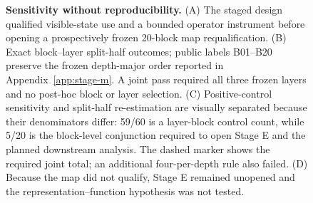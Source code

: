 \begin{figure}[H]
\caption{\label{fig:main}\textbf{Sensitivity without reproducibility.} (A) The staged design qualified visible-state use and a bounded operator instrument before opening a prospectively frozen 20-block map requalification. (B) Exact block--layer split-half outcomes; public labels B01--B20 preserve the frozen depth-major order reported in Appendix~\ref{app:stage-m}. A joint pass required all three frozen layers and no post-hoc block or layer selection. (C) Positive-control sensitivity and split-half re-estimation are visually separated because their denominators differ: 59/60 is a layer-block control count, while 5/20 is the block-level conjunction required to open Stage E and the planned downstream analysis. The dashed marker shows the required joint total; an additional four-per-depth rule also failed. (D) Because the map did not qualify, Stage E remained unopened and the representation--function hypothesis was not tested.}
\end{figure}
